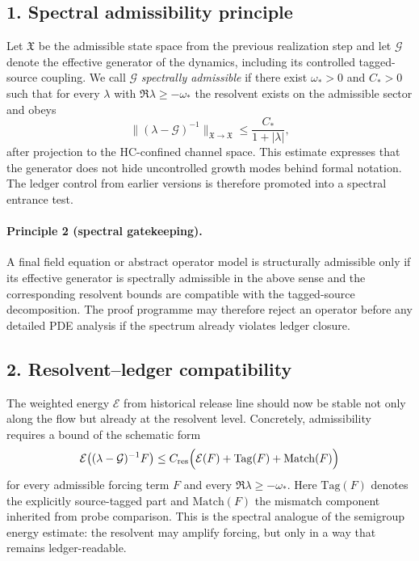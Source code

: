 \documentclass[12pt,a4paper]{article}
\DeclareRobustCommand{\QSCver}[1]{archival stage}
\renewcommand{\QSCver}[1]{historical release line}
\begin{document}
\subsection*{1. Spectral admissibility principle}
Let $\mathfrak X$ be the admissible state space from the previous realization step and
let $\mathcal G$ denote the effective generator of the dynamics, including its
controlled tagged-source coupling. We call $\mathcal G$ \emph{spectrally admissible}
if there exist $\omega_*>0$ and $C_*>0$ such that for every $\lambda$ with
$\Re \lambda\ge -\omega_*$ the resolvent exists on the admissible sector and obeys
\[
\| (\lambda-\mathcal G)^{-1} \|_{\mathfrak X\to\mathfrak X}
\le \frac{C_*}{1+|\lambda|},
\]
after projection to the HC-confined channel space. This estimate expresses that the
generator does not hide uncontrolled growth modes behind formal notation. The ledger
control from earlier versions is therefore promoted into a spectral entrance test.

\paragraph{Principle 2 (spectral gatekeeping).}
A final field equation or abstract operator model is structurally admissible only
if its effective generator is spectrally admissible in the above sense and the
corresponding resolvent bounds are compatible with the tagged-source decomposition.
The proof programme may therefore reject an operator before any detailed PDE analysis
if the spectrum already violates ledger closure.

\subsection*{2. Resolvent--ledger compatibility}
The weighted energy $\mathcal E$ from \QSCver{v2.7.0} should now be stable not only along the
flow but already at the resolvent level. Concretely, admissibility requires a bound
of the schematic form
\[
\mathcal E\bigl((\lambda-\mathcal G)^{-1}F\bigr)
\le C_{\mathrm{res}}
\Bigl( \mathcal E(F)
+ \mathrm{Tag}(F)
+ \mathrm{Match}(F)\Bigr)
\]
for every admissible forcing term $F$ and every $\Re\lambda\ge -\omega_*$. Here
$\mathrm{Tag}(F)$ denotes the explicitly source-tagged part and
$\mathrm{Match}(F)$ the mismatch component inherited from probe comparison. This is
the spectral analogue of the semigroup energy estimate: the resolvent may amplify
forcing, but only in a way that remains ledger-readable.
\end{document}
